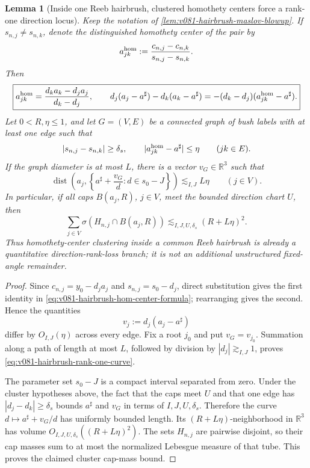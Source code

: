 \documentclass[10pt]{article}
\newtheorem{lemma}[theorem]{Lemma}
\newcommand{\dist}{\operatorname{dist}}
\begin{document}
\begin{lemma}[Inside one Reeb hairbrush, clustered homothety centers force a rank-one direction locus]
\label{lem:v081-hairbrush-cluster-rank-one}
Keep the notation of \cref{lem:v081-hairbrush-maslov-blowup}.  If
\(s_{n,j}\ne s_{n,k}\), denote the distinguished homothety center of the pair by
\[
a_{jk}^{\rm hom}
:=
\frac{c_{n,j}-c_{n,k}}{s_{n,j}-s_{n,k}}.
\]
Then
\begin{equation}
\label{eq:v081-hairbrush-hom-center-formula}
\boxed{
a_{jk}^{\rm hom}
=
\frac{d_ka_k-d_ja_j}{d_k-d_j},
\qquad
d_j(a_j-a^\sharp)-d_k(a_k-a^\sharp)
=
-(d_k-d_j)(a_{jk}^{\rm hom}-a^\sharp).
}
\end{equation}
Let \(0<R,\eta\le1\), and let \(G=(V,E)\) be a connected graph of bush labels with at least one
edge such that
\begin{equation}
\label{eq:v081-hairbrush-cluster-hypotheses}
|s_{n,j}-s_{n,k}|\ge\delta_s,
\qquad
|a_{jk}^{\rm hom}-a^\sharp|\le\eta
\qquad(jk\in E).
\end{equation}
If the graph diameter is at most \(L\), there is a vector \(v_G\in\mathbb R^3\) such that
\begin{equation}
\label{eq:v081-hairbrush-rank-one-curve}
\boxed{
\dist\!\left(
a_j,
\left\{a^\sharp+\frac{v_G}{d}:d\in s_0-J\right\}
\right)
\lesssim_{I,J}L\eta
\qquad(j\in V).
}
\end{equation}
In particular, if all caps \(B(a_j,R)\), \(j\in V\), meet the bounded direction chart \(U\), then
\begin{equation}
\label{eq:v081-hairbrush-cluster-cap-mass}
\boxed{
\sum_{j\in V}
\sigma\!\left(H_{n,j}\cap B(a_j,R)\right)
\lesssim_{I,J,U,\delta_s}
(R+L\eta)^2.
}
\end{equation}
Thus homothety-center clustering inside a common Reeb hairbrush is already a quantitative
direction-rank-loss branch; it is not an additional unstructured fixed-angle remainder.
\end{lemma}

\begin{proof}
Since \(c_{n,j}=y_0-d_ja_j\) and \(s_{n,j}=s_0-d_j\), direct substitution gives the first identity
in \eqref{eq:v081-hairbrush-hom-center-formula}; rearranging gives the second.  Hence the quantities
\[
v_j:=d_j(a_j-a^\sharp)
\]
differ by \(O_{I,J}(\eta)\) across every edge.  Fix a root \(j_0\) and put \(v_G=v_{j_0}\).
Summation along a path of length at most \(L\), followed by division by
\(|d_j|\gtrsim_{I,J}1\), proves
\eqref{eq:v081-hairbrush-rank-one-curve}.

The parameter set \(s_0-J\) is a compact interval separated from zero.  Under the cluster
hypotheses above, the fact that the caps meet \(U\) and that one edge
has \(|d_j-d_k|\ge\delta_s\) bounds \(a^\sharp\) and \(v_G\) in terms of
\(I,J,U,\delta_s\).  Therefore the curve
\(d\mapsto a^\sharp+v_G/d\) has uniformly bounded length.  Its
\((R+L\eta)\)-neighborhood in \(\mathbb R^3\) has volume
\(O_{I,J,U,\delta_s}((R+L\eta)^2)\).  The sets \(H_{n,j}\) are pairwise disjoint, so their cap
masses sum to at most the normalized Lebesgue measure of that tube.  This proves the claimed
cluster cap-mass bound.
\end{proof}
\end{document}
